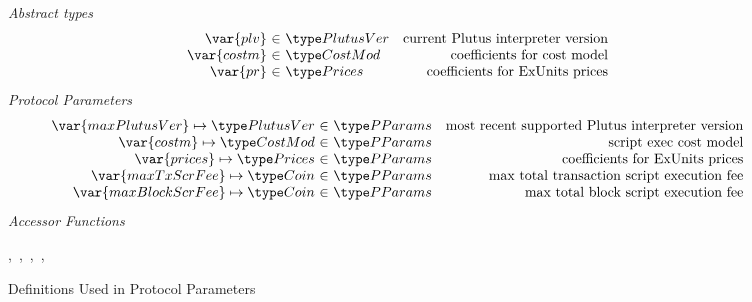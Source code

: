 \begin{figure*}[htb]
  \emph{Abstract types}
  \begin{equation*}
    \begin{array}{r@{~\in~}lr}
      \var{plv} & \PlutusVer & \text{current Plutus interpreter version}\\
      \var{costm} & \CostMod & \text{coefficients for cost model} \\
      \var{pr} & \Prices & \text{coefficients for ExUnits prices} \\
    \end{array}
  \end{equation*}
  \emph{Protocol Parameters}
  \begin{equation*}
      \begin{array}{r@{~\in~}lr}
        \var{maxPlutusVer} \mapsto \PlutusVer & \PParams & \text{most recent supported Plutus interpreter version}\\
        \var{costm} \mapsto \CostMod & \PParams & \text{script exec cost model}\\
        \var{prices} \mapsto \Prices & \PParams & \text{coefficients for ExUnits prices} \\
        \var{maxTxScrFee} \mapsto \Coin & \PParams & \text{max total transaction script execution fee}\\
        \var{maxBlockScrFee} \mapsto \Coin & \PParams & \text{max total block script execution fee}\\
      \end{array}
  \end{equation*}
  \emph{Accessor Functions}
  \begin{center}
  ,~,~,~,~
  \end{center}
  \caption{Definitions Used in Protocol Parameters}
  \label{fig:defs:protocol-parameters}
\end{figure*}


\clearpage
